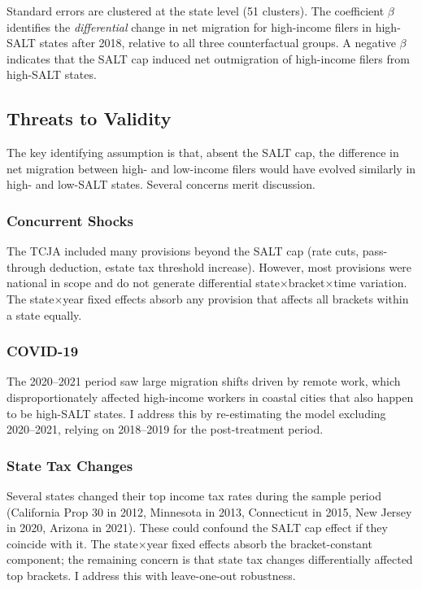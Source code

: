 \documentclass[12pt]{article}
\begin{document}
Standard errors are clustered at the state level (51 clusters). The coefficient $\beta$ identifies the \textit{differential} change in net migration for high-income filers in high-SALT states after 2018, relative to all three counterfactual groups. A negative $\beta$ indicates that the SALT cap induced net outmigration of high-income filers from high-SALT states.

\subsection{Threats to Validity}

The key identifying assumption is that, absent the SALT cap, the difference in net migration between high- and low-income filers would have evolved similarly in high- and low-SALT states. Several concerns merit discussion.

\subsubsection*{Concurrent Shocks} The TCJA included many provisions beyond the SALT cap (rate cuts, pass-through deduction, estate tax threshold increase). However, most provisions were national in scope and do not generate differential state$\times$bracket$\times$time variation. The state$\times$year fixed effects absorb any provision that affects all brackets within a state equally.

\subsubsection*{COVID-19} The 2020--2021 period saw large migration shifts driven by remote work, which disproportionately affected high-income workers in coastal cities that also happen to be high-SALT states. I address this by re-estimating the model excluding 2020--2021, relying on 2018--2019 for the post-treatment period.

\subsubsection*{State Tax Changes} Several states changed their top income tax rates during the sample period (California Prop 30 in 2012, Minnesota in 2013, Connecticut in 2015, New Jersey in 2020, Arizona in 2021). These could confound the SALT cap effect if they coincide with it. The state$\times$year fixed effects absorb the bracket-constant component; the remaining concern is that state tax changes differentially affected top brackets. I address this with leave-one-out robustness.
\end{document}
